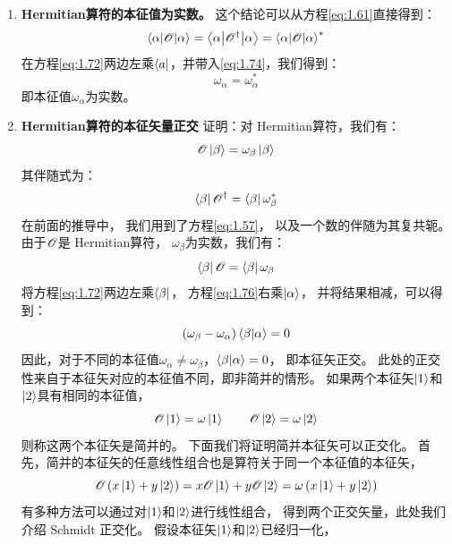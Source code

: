 \begin{enumerate}[]
 \item {\bfseries Hermitian算符的本征值为实数。} 这个结论可以从方程\eqref{eq:1.61}直接得到：
 \begin{equation}
     \left\langle \alpha\middle\vert \mathscr{O} \middle\vert \alpha\right\rangle = \left\langle\alpha\middle\vert\mathscr{O}^\dagger\middle\vert\alpha\right\rangle = {\left\langle \alpha\middle\vert \mathscr{O} \middle\vert \alpha\right\rangle}^\ast
     \label{eq:1.74}
 \end{equation}
 在方程\eqref{eq:1.72}两边左乘$\Bra{a}$，并带入\eqref{eq:1.74}，我们得到：
 \begin{equation}
     \omega_\alpha = \omega_\alpha^\ast
     \label{eq:1.75}
 \end{equation}
 即本征值$\omega_\alpha$为实数。
 
 \item {\bfseries Hermitian算符的本征矢量正交} 证明：对 Hermitian算符，我们有：
 \[\mathscr{O}\Ket{\beta} = \omega_\beta \Ket{\beta}\]
 其伴随式为：
 \[\Bra{\beta}\mathscr O^\dagger = \Bra{\beta}\omega_\beta^\ast\]
 在前面的推导中，
 我们用到了方程\eqref{eq:1.57}，
 以及一个数的伴随为其复共轭。
 由于$\mathscr{O}$是 Hermitian算符，
 $\omega_\beta$为实数，我们有：
 \begin{equation}
     \Bra{\beta}\mathscr{O} = \Bra{\beta}\omega_\beta
     \label{eq:1.76}
 \end{equation}
 将方程\eqref{eq:1.72}两边左乘$\Bra{\beta}$，
 方程\eqref{eq:1.76}右乘$\Ket{\alpha}$，
 并将结果相减，可以得到：
 \begin{equation}
     \left(\omega_\beta - \omega_\alpha\right)\langle \beta \vert \alpha \rangle = 0
     \label{eq:1.77}
 \end{equation}
 因此，对于不同的本征值$\omega_\alpha \neq \omega_\beta$，$\langle \beta \vert \alpha \rangle = 0$，
 即本征矢正交。
 此处的正交性来自于本征矢对应的本征值不同，即非简并的情形。
 如果两个本征矢$\Ket{1}$和$\Ket{2}$具有相同的本征值，
 \begin{equation}
     \mathscr{O}\Ket{1} = \omega\Ket{1} \qquad \mathscr{O}\Ket{2} = \omega\Ket{2}
     \label{eq:1.78}
 \end{equation}
 则称这两个本征矢是简并的。
 下面我们将证明简并本征矢可以正交化。
 首先，简并的本征矢的任意线性组合也是算符关于同一个本征值的本征矢，
 \begin{equation}
     \mathscr{O}\left(x\Ket{1}+y\Ket{2}\right) = x\mathscr{O}\Ket{1} + y\mathscr{O}\Ket{2} = \omega\left(x\Ket{1}+y\Ket{2}\right)
     \label{eq:1.79}
 \end{equation}
 有多种方法可以通过对$\Ket{1}$和$\Ket{2}$进行线性组合，
 得到两个正交矢量，此处我们介绍 Schmidt 正交化。
 假设本征矢$\Ket{1}$和$\Ket{2}$已经归一化，

\end{enumerate}

